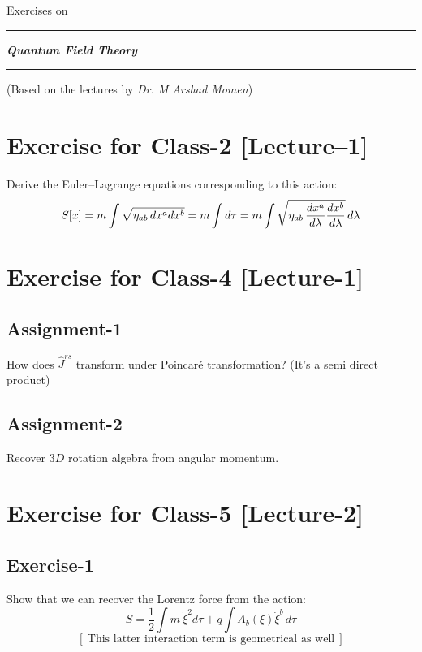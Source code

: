 \documentclass[14pt]{article} %
\begin{document}
\begin{titlepage}
    \centering
    \vspace*{3cm}
    {Exercises on \par}
    \vspace{1cm}
    \hrule
    \vspace{1cm}
    {\huge \textit{\textbf{Quantum Field Theory}} \par}
    \vspace{1cm}
    \hrule
    \vspace{1cm}
    \small
   (Based on the lectures by \textit{Dr. M Arshad Momen})
\vspace{3cm}
\end{titlepage}
\tableofcontents
\newpage
\section{Exercise for Class-2 [Lecture--1]}
Derive the Euler–Lagrange equations corresponding to this action:
\[
S[x] = m \int \sqrt{ \eta_{ab} \, dx^a dx^b }=m \int d \tau \\
    = m \int \sqrt{ \eta_{ab} \, \frac{dx^a}{d\lambda} \frac{dx^b}{d\lambda} } \, d\lambda
\]
\section{Exercise for Class-4 [Lecture-1]}
\subsection{Assignment-1}
How does $\hat{J}^{rs}$ transform under Poincaré transformation? (It's a semi direct product)

\subsection{Assignment-2}
Recover $3D$ rotation algebra from angular momentum.

\section{Exercise for Class-5 [Lecture-2]}
\subsection{Exercise-1}
Show that we can recover the Lorentz force from the action:
\[
S = \frac{1}{2} \int m~ \dot{\xi}^2 d\tau + q \int A_b(\xi) \dot{\xi}^b \, d\tau
\]
\[
\left[~\text{This latter interaction term is geometrical as well}~\right]
\]
\end{document}
